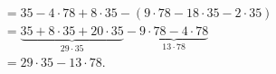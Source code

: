 \documentclass{article}
\begin{document}
\begin{enumerate}
\begin{itemize}
\begin{align*}
            &= 35 - 4 \cdot 78 + 8 \cdot 35 - (9 \cdot 78 - 18 \cdot 35 - 2 \cdot 35)\\
            &= \underbrace{35 + 8 \cdot 35 + 20 \cdot 35}_{29 \cdot 35} - \underbrace{9 \cdot 78 - 4 \cdot 78}_{13 \cdot 78} \\
            &= 29 \cdot 35 - 13 \cdot 78.
            \end{align*}
        \end{itemize}
\end{enumerate}
\end{document}
